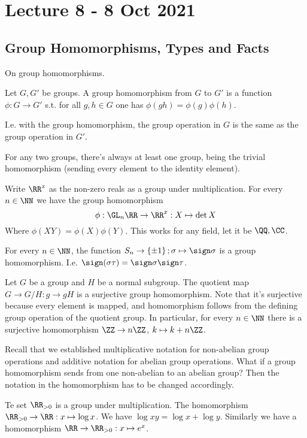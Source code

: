 \section{Lecture 8 - 8 Oct 2021}
\subsection{Group Homomorphisms, Types and Facts}
On group homomorphisms. 
\begin{definition}
  Let $G,G'$ be groups. A group homomorphism from $G$ to $G'$ is a function $\phi:G\to G'$
  s.t. for all $g,h\in G$ one has $\phi(gh)=\phi(g) \phi(h)$.
  \label{groupHomomorphism}
\end{definition}
I.e. with the group homomorphism, the group operation in $G$ is the same as the group
operation in $G'$.

\begin{example}
  For any two groups, there's always at least one group, being the trivial homomorphism
  (sending every element to the identity element).
\end{example}

\begin{example}
  Write $\RR^x$ as the non-zero reals as a group under multiplication. For every $n\in\NN$
  we have the group homomorphism
  \[ \phi: \GL_n \RR \to \RR^x:X\mapsto \det X\]
  Where $\phi(XY)=\phi(X)\phi(Y)$. This works for any field, let it be $\QQ,\CC$.
\end{example}

\begin{example}
  For every $n\in\NN$, the function $S_n\to \left\{ \pm 1 \right\}; \sigma\mapsto
  \sign\sigma$ is a group homomorphism. I.e. $\sign (\sigma\tau) = \sign \sigma \sign
  \tau$.
\end{example}

\begin{example}
  Let $G$ be a group and $H$ be a normal subgroup. The quotient map $G\to G/H : g\to gH$
  is a surjective group homomorphism. Note that it's surjective because every element is
  mapped, and homomorphism follows from the defining group operation of the quotient
  group. In particular, for every $n\in\NN$ there is a surjective homomorphism $\ZZ\to
  n\ZZ$, $k\mapsto k+n\ZZ$.
\end{example}

Recall that we established multiplicative notation for non-abelian group operations and
additive notation for abelian group operations. What if a group homomorphism sends from
one non-abelian to an abelian group? Then the notation in the homomorphism has to be
changed accordingly.
\begin{example}
  Te set $\RR_{>0}$ is a group under multiplication. The homomorphism $\RR_{>0}\to
  \RR:x\mapsto \log x$. We have $\log xy = \log x + \log y$. Similarly we have a
  homomorphism $\RR\to\RR_{>0} : x\mapsto e^{x}$.
\end{example}

